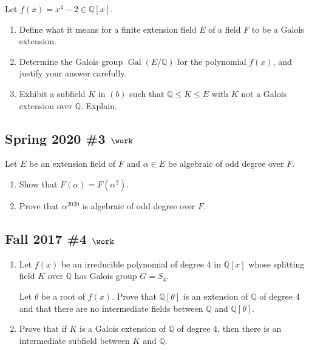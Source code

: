 Let \(f(x) = x^4-2 \in {\mathbb{Q}}[x]\).

\begin{enumerate}
\def\labelenumi{\alph{enumi}.}
\item
  Define what it means for a finite extension field \(E\) of a field
  \(F\) to be a Galois extension.
\item
  Determine the Galois group \(\operatorname{Gal}(E/{\mathbb{Q}})\) for
  the polynomial \(f(x)\), and justify your answer carefully.
\item
  Exhibit a subfield \(K\) in \((b)\) such that
  \({\mathbb{Q}}\leq K \leq E\) with \(K\) not a Galois extension over
  \({\mathbb{Q}}\). Explain.
\end{enumerate}

\hypertarget{spring-2020-3-work}{%
\subsection{\texorpdfstring{Spring 2020 \#3
\(\work\)}{Spring 2020 \#3 \textbackslash work}}\label{spring-2020-3-work}}

Let \(E\) be an extension field of \(F\) and \(\alpha\in E\) be
algebraic of odd degree over \(F\).

\begin{enumerate}
\def\labelenumi{\alph{enumi}.}
\item
  Show that \(F(\alpha) = F(\alpha^2)\).
\item
  Prove that \(\alpha^{2020}\) is algebraic of odd degree over \(F\).
\end{enumerate}

\hypertarget{fall-2017-4-work}{%
\subsection{\texorpdfstring{Fall 2017 \#4
\(\work\)}{Fall 2017 \#4 \textbackslash work}}\label{fall-2017-4-work}}

\begin{enumerate}
\def\labelenumi{\alph{enumi}.}
\item
  Let \(f (x)\) be an irreducible polynomial of degree 4 in
  \({\mathbb{Q}}[x]\) whose splitting field \(K\) over \({\mathbb{Q}}\)
  has Galois group \(G = S_4\).

  Let \(\theta\) be a root of \(f(x)\). Prove that
  \({\mathbb{Q}}[\theta]\) is an extension of \({\mathbb{Q}}\) of degree
  4 and that there are no intermediate fields between \({\mathbb{Q}}\)
  and \({\mathbb{Q}}[\theta]\).
\item
  Prove that if \(K\) is a Galois extension of \({\mathbb{Q}}\) of
  degree 4, then there is an intermediate subfield between \(K\) and
  \({\mathbb{Q}}\).
\end{enumerate}

